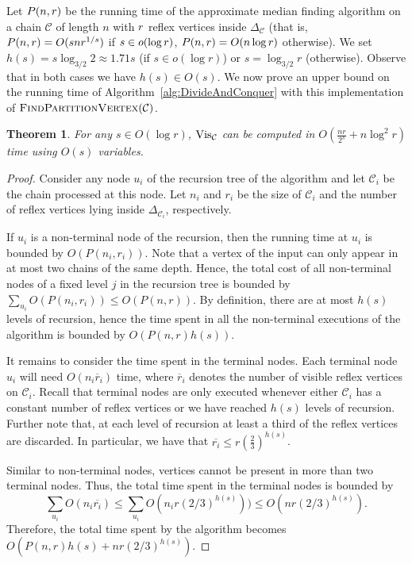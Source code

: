 \documentclass[a4paper]{article}
\newtheorem{theorem}{Theorem}
\newcommand{\coneC}{\ensuremath{{{\Delta_{\mathcal C}}}}}
\newcommand{\C}{\ensuremath{{\mathcal C}}}
\begin{document}
Let $P(n,r)$ be the running time of the approximate median finding algorithm on a chain $\C$ of length $n$ with $r$ reflex vertices inside $\coneC$ (that is, $P(n,r)=O(snr^{1/s})$ if $s\in o(\log r)$, $P(n,r)=O(n\log r)$ otherwise). We set $h(s)=s \log_{3/2}2 \approx 1.71 s$ (if $s\in o(\log r)$) or $s=\log_{3/2}r$ (otherwise). Observe that in both cases we have $h(s)\in O(s)$. We now prove an upper bound on the running time of Algorithm~\ref{alg:DivideAndConquer} with this implementation of $\textsc{FindPartitionVertex}(\mathcal C)$.


\begin{theorem}\label{theo_determ}
For any $s\in O(\log r)$, $\mathrm{Vis}_{\mathcal{C}}$ can be computed in $O(\frac{nr}{2^{s}}+n\log^2 r)$  time using $O(s)$ variables.
\end{theorem}
\begin{proof}
Consider any node $u_i$ of the recursion tree of the algorithm and let $\mathcal C_i$ be the chain processed at this node. Let $n_i$ and $r_i$ be the size of $\mathcal C_i$ and the number of reflex vertices lying inside $\Delta_{\mathcal C_i}$, respectively.

If $u_i$ is a non-terminal node of the recursion, then the running time at $u_i$ is bounded by $O(P(n_i,r_i))$. 
Note that a vertex of the input can only appear in at most two chains of the same depth. Hence, the total cost of all non-terminal nodes of a fixed level $j$ in the recursion tree is bounded by $\sum_{u_i} O(P(n_i, r_i)) \leq O(P(n,r))$. By definition, there are at most $h(s)$ levels of recursion, hence the time spent in all the non-terminal executions of the algorithm is bounded by $O(P(n,r)h(s))$.

It remains to consider the time spent in the terminal nodes. Each terminal node $u_i$ will need $O(n_i\overline{r}_i)$ time, where $\overline{r}_i$ denotes the number of visible reflex vertices on $\mathcal C_i$. Recall that terminal nodes are only executed whenever either $\C_i$ has a constant number of reflex vertices or we have reached $h(s)$ levels of recursion. Further note that, at each level of recursion at least a third of the reflex vertices are discarded. In particular, we have that $\overline{r_i}\leq r(\frac{2}{3})^{h(s)}$. 

Similar to non-terminal nodes, vertices cannot be present in more than two terminal nodes. Thus, the total time spent in the terminal nodes is bounded by $$\sum_{u_i} O(n_i\overline{r_i}) \leq \sum_{u_i} O(n_ir(2/3)^{h(s)})) \leq O(nr(2/3)^{h(s)}).$$ Therefore, the total time spent by the algorithm becomes  $O(P(n,r)h(s)+nr(2/3)^{h(s)})$. 


\end{proof}
\end{document}
